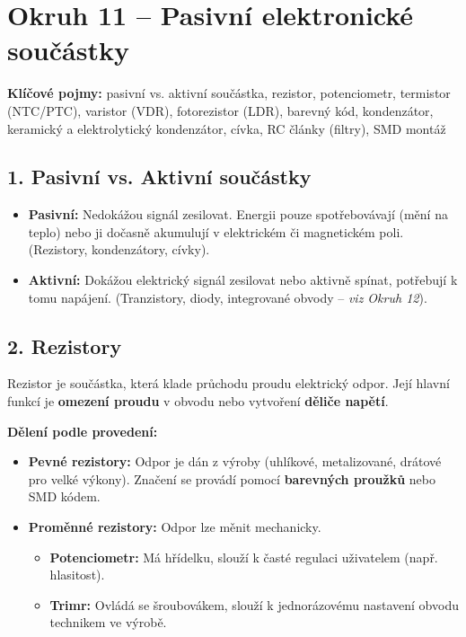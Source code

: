 \documentclass[a4paper,10pt]{article}
\begin{document}
\section*{\large Okruh 11 – Pasivní elektronické součástky}

\begin{pojmybox}
\textbf{Klíčové pojmy:}
pasivní vs. aktivní součástka, rezistor, potenciometr, termistor (NTC/PTC), varistor (VDR), fotorezistor (LDR), barevný kód, kondenzátor, keramický a elektrolytický kondenzátor, cívka, RC články (filtry), SMD montáž
\end{pojmybox}

\begin{vysvetlenibox}

\subsection*{1. Pasivní vs. Aktivní součástky}

\begin{itemize}
    \item \textbf{Pasivní:} Nedokážou signál zesilovat. Energii pouze spotřebovávají (mění na teplo) nebo ji dočasně akumulují v elektrickém či magnetickém poli. (Rezistory, kondenzátory, cívky).
    \item \textbf{Aktivní:} Dokážou elektrický signál zesilovat nebo aktivně spínat, potřebují k tomu napájení. (Tranzistory, diody, integrované obvody – \textit{viz Okruh 12}).
\end{itemize}

\subsection*{2. Rezistory}

Rezistor je součástka, která klade průchodu proudu elektrický odpor. Její hlavní funkcí je \textbf{omezení proudu} v obvodu nebo vytvoření \textbf{děliče napětí}.

\textbf{Dělení podle provedení:}
\begin{itemize}
    \item \textbf{Pevné rezistory:} Odpor je dán z výroby (uhlíkové, metalizované, drátové pro velké výkony). Značení se provádí pomocí \textbf{barevných proužků} nebo SMD kódem.
    \item \textbf{Proměnné rezistory:} Odpor lze měnit mechanicky.
    \begin{itemize}
        \item \textbf{Potenciometr:} Má hřídelku, slouží k časté regulaci uživatelem (např. hlasitost).
        \item \textbf{Trimr:} Ovládá se šroubovákem, slouží k jednorázovému nastavení obvodu technikem ve výrobě.
    \end{itemize}
\end{itemize}


\end{vysvetlenibox}
\end{document}
